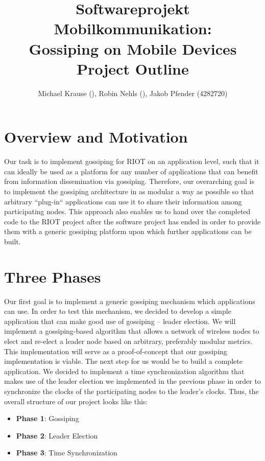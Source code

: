 \documentclass[11pt,
  a4paper,
  ngerman,
  BCOR=7mm
]{scrartcl}
\author{Michael Krause (), Robin Nehls (), Jakob Pfender (4282720)}
\title{Softwareprojekt Mobilkommunikation:\\Gossiping on Mobile
Devices\\Project Outline}
\begin{document}
\maketitle

\newpage

\section*{Overview and Motivation}
\label{sec:overview_motivation}
Our task is to implement gossiping for RIOT on an application level,
such that it can ideally be used as a platform for any number of
applications that can benefit from information dissemination via
gossiping. Therefore, our overarching goal is to implement the gossiping
architecture in as modular a way as possible so that arbitrary
``plug-in`` applications can use it to share their information among
participating nodes. This approach also enables us to hand over the
completed code to the RIOT project after the software project has ended
in order to provide them with a generic gossiping platform upon which
further applications can be built.

\section*{Three Phases}
\label{sec:three_phases}
Our first goal is to implement a generic gossiping mechanism which
applications can use. In order to test this mechanism, we decided to
develop a simple application that can make good use of gossiping --
leader election. We will implement a gossiping-based algorithm that
allows a network of wireless nodes to elect and re-elect a leader node
based on arbitrary, preferably modular metrics. This implementation will
serve as a proof-of-concept that our gossiping implementation is viable.
The next step for us would be to build a complete application. We
decided to implement a time synchronization algorithm that makes use of
the leader election we implemented in the previous phase in order to
synchronize the clocks of the participating nodes to the leader's
clocks. Thus, the overall structure of our project looks like this:

\begin{itemize}
  \item \textbf{Phase 1}: Gossiping
  \item \textbf{Phase 2}: Leader Election
  \item \textbf{Phase 3}: Time Synchronization
\end{itemize}
\end{document}
